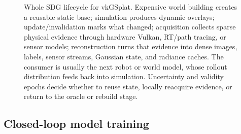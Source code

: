 \documentclass[10pt,journal,onecolumn]{IEEEtran}
\begin{document}
\begin{figure}[t]
{%
}
\caption{Whole SDG lifecycle for vkGSplat. Expensive world building creates a
reusable static base; simulation produces dynamic overlays; update/invalidation
marks what changed; acquisition collects sparse physical evidence through
hardware Vulkan, RT/path tracing, or sensor models; reconstruction turns that
evidence into dense images, labels, sensor streams, Gaussian state, and radiance
caches. The consumer is usually the next robot or world model, whose rollout
distribution feeds back into simulation. Uncertainty and validity epochs decide
whether to reuse state, locally reacquire evidence, or return to the oracle or
rebuild stage.}
\label{fig:sdg-lifecycle}
\end{figure}

\subsection{Closed-loop model training}
\label{sec:closed-loop-training}
\end{document}
